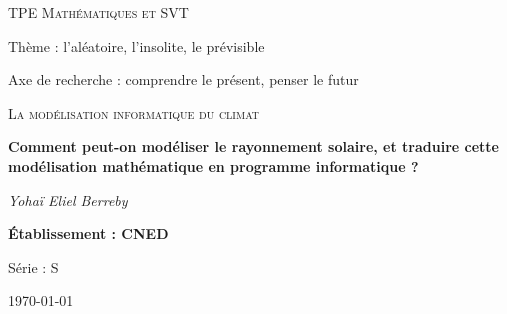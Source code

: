 \documentclass[12pt]{article}
\begin{document}
\begin{titlepage}
	\centering
	
	{\scshape\Large TPE Mathématiques et SVT\par}
	\vspace{0.2cm}	
	Thème : l'aléatoire, l'insolite, le prévisible\par
	Axe de recherche : comprendre le présent, penser le futur\par
	\vspace{1.5cm}

	{\scshape\LARGE La modélisation informatique du climat \par}
	\vspace{1cm}
	{\huge\bfseries Comment peut-on modéliser le rayonnement solaire, et traduire cette modélisation mathématique en programme informatique ?\par}

	\vspace{1cm}
	{\Large\itshape Yohaï Eliel Berreby\par}
	
	\vfill
	
	
	{\Large\bfseries Établissement : CNED\par
	Série : S }

	\vfill

	{\large \today\par}
\end{titlepage}


\begin{abstract}
Nous nous sommes demandé comment on pouvait construire des modèles climatiques, tenant compte de paramètres qui couvrent la géométrie, la physique, la chimie, et les mathématiques, et comment l’agencement de ces paramètres, qui deviennent des variables pour le mathématicien, peut prendre place dans un programme informatique.

Pour ce faire, après avoir défini le vocabulaire important et exploré le fonctionnement de modèles aujourd'hui utilisés à grande échelle, nous nous intéressons à la variable de l'\textbf{éclairement énergétique solaire} en écrivant un programme reflétant le passage du phénomène de rayonnement solaire à sa modélisation, puis à son écriture dans un langage de programmation.

Nous testons ensuite ce programme, et comparons les résultats à ceux attendus.
\end{abstract}


\clearpage
\tableofcontents{} %
\end{document}
